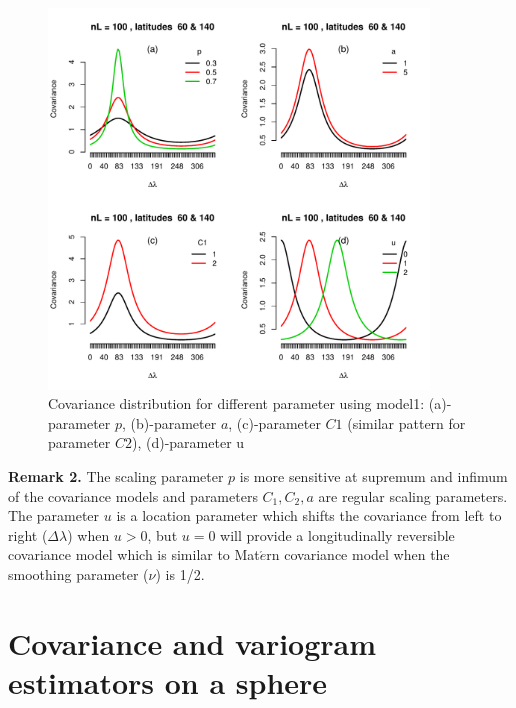 			\begin{figure}[H]
				\centering
				\includegraphics[width=0.9\textwidth]{graphs/parameters_model1_2}
				\caption[Covariance distribution for different parameters using model1:] {Covariance distribution for different parameter using model1:  (a)-parameter $p$, (b)-parameter $a$, (c)-parameter $C1$ (similar pattern for parameter $C2$), (d)-parameter u}
				\label{fig_parameter_comp}
			\end{figure}
			
{\bf Remark 2.} The scaling parameter $p$ is more sensitive at supremum and infimum of the covariance models and parameters $C_1, C_2, a$ are regular scaling parameters. The parameter $u$ is a location parameter which shifts the covariance from left to right ($\Delta\lambda$) when $u>0$, but $u=0$ will provide a longitudinally reversible covariance model which is similar to Mat$\acute{e}$rn covariance model when the smoothing parameter ($\nu$) is 1/2.\\


			\section{Covariance and variogram estimators on a sphere}


